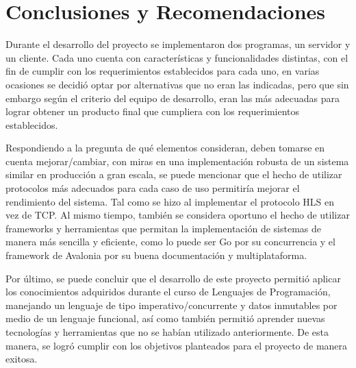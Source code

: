 \section{Conclusiones y Recomendaciones}

Durante el desarrollo del proyecto se implementaron dos programas, un servidor
y un cliente. Cada uno cuenta con características y funcionalidades distintas,
con el fin de cumplir con los requerimientos establecidos para cada uno, en varias 
ocasiones se decidió optar por alternativas que no eran las indicadas, pero que sin 
embargo según el criterio del equipo de desarrollo, eran las más adecuadas para
lograr obtener un producto final que cumpliera con los requerimientos establecidos.

Respondiendo a la pregunta de qué elementos consideran, deben tomarse en cuenta
mejorar/cambiar, con miras en una implementación robusta de un sistema similar
en producción a gran escala, se puede mencionar que el hecho de utilizar 
protocolos más adecuados para cada caso de uso permitiría mejorar el rendimiento
del sistema. Tal como se hizo al implementar el protocolo HLS en vez de TCP. Al
mismo tiempo, también se considera oportuno el hecho de utilizar frameworks y
herramientas que permitan la implementación de sistemas de manera más sencilla y
eficiente, como lo puede ser Go por su concurrencia y el framework de Avalonia
por su buena documentación y multiplataforma.

Por último, se puede concluir que el desarrollo de este proyecto permitió
aplicar los conocimientos adquiridos durante el curso de Lenguajes de
Programación, manejando un lenguaje de tipo imperativo/concurrente y datos 
inmutables por medio de un lenguaje funcional, así como también permitió
aprender nuevas tecnologías y herramientas que no se habían utilizado
anteriormente. De esta manera, se logró cumplir con los objetivos planteados
para el proyecto de manera exitosa.